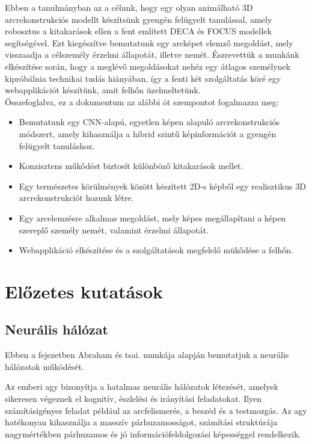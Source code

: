 \documentclass[12pt,a4]{article}
\begin{document}
        Ebben a tanulmányban az a célunk, hogy egy olyan animálható 3D arcrekonstrukciós modellt készítsünk gyengén felügyelt tanulással, amely robosztus a kitakarások ellen a fent említett DECA és FOCUS modellek segítségével. Ezt kiegészítve bemutatunk egy arcképet elemző megoldást, mely visszaadja a célszemély érzelmi állapotát, illetve nemét. Észrevettük a munkánk elkészítése során, hogy a meglévő megoldásokat nehéz egy átlagos személynek kipróbálnia technikai tudás hiányában, így a fenti két szolgáltatás köré egy webapplikációt készítünk, amit felhőn üzelmeltetünk.\\

        Összefoglalva, ez a dokumentum az alábbi öt szempontot fogalmazza meg:
        \begin{itemize}
	       \item Bemutatunk egy CNN-alapú, egyetlen képen alapuló arcrekonstrukciós módszert, amely kihasználja a hibrid szintű képinformációt a gyengén felügyelt tanuláshoz.
	       \item Konzisztens műkődést biztosít különböző kitakarások mellet.
	       \item Egy természetes körülmények között készített 2D-s képből egy realisztikus 3D arcrekonstrukciót hozunk létre.
	       \item Egy arcelemzésre alkalmas megoldást, mely képes megállapítani a képen szereplő személy nemét, valamint érzelmi állapotát.
	       \item Webapplikáció elkészítése és a szolgáltatások megfelelő mükődése a felhőn.
        \end{itemize}

    \section{Előzetes kutatások}
	\subsection{Neurális hálózat}
    Ebben a fejezetben \cite{ann}Abraham és tsai. munkája alapján bemutatjuk a neurális hálózatok működését.
    
	\label{NN}
	Az emberi agy bizonyítja a hatalmas neurális hálózatok létezését, amelyek sikeresen végeznek el kognitív, észlelési és irányítási feladatokat. Ilyen számításigényes feladat például az arcfelismerés, a beszéd és a testmozgás. Az agy hatékonyan kihasználja a masszív párhuzamosságot, számítási struktúrája nagymértékben párhuzamos és jó információfeldolgozási képességgel rendelkezik.
	
\end{document}
